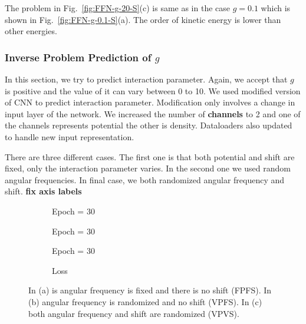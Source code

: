 \documentclass[a4paper,times,12pt]{article}
\begin{document}
The problem in Fig.~\ref{fig:FFN-g-20-S}(c) is same as in the case $g = 0.1$ which is shown in Fig.~\ref{fig:FFN-g-0.1-S}(a). The order of kinetic energy is  lower than other energies. 

\subsubsection{Inverse Problem Prediction of ${g}$}

In this section, we try to predict interaction parameter. Again, we accept that $g$ is positive and the value of it can vary between 0 to 10. We used modified version of CNN to predict interaction parameter. Modification only involves a change in input layer of the network. We increased the number of \textbf{channels} to 2 and one of the channels represents potential the other is density. Dataloaders also updated to handle new input representation. 

There are three different cases. The first one is that both potential and shift are fixed, only the interaction parameter varies. In the second one we used random angular frequencies. In final case, we both randomized angular frequency and shift. \textbf{fix axis labels}


\begin{figure}[H]
    \centering
    \begin{subfigure}[t]{0.45\textwidth}
		\centering
    	
    	\caption{Epoch = 30}
		\label{fig:a}
    \end{subfigure}
    \begin{subfigure}[t]{0.45\textwidth}
        \centering
    	
    	\caption{Epoch = 30}
		\label{fig:b}
    \end{subfigure}
    \begin{subfigure}[t]{0.45\textwidth}
        \centering
		
    	\caption{Epoch = 30}
		\label{fig:c}
    \end{subfigure}
    \begin{subfigure}[t]{0.45\textwidth}
        \centering
		
    	\caption{Loss}
		\label{fig:d}
    \end{subfigure}

	\caption{In (a) is angular frequency is fixed and there is no shift (FPFS). In (b) angular frequency is randomized and no shift (VPFS). In (c) both angular frequency and shift are randomized (VPVS).}
\label{fig:FFN-g-pred}
\end{figure}
\end{document}
